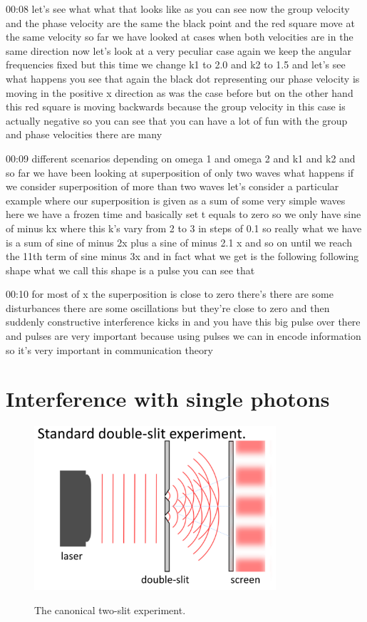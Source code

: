 00:08
let's see what what that looks like as you can see
now the group velocity and the phase velocity are the same
the black point and the red square move at the same velocity
so far we have looked at cases when both velocities
are in the same direction now let's look at a very peculiar case
again we keep the angular frequencies fixed but this time we change k1 to 2.0
and k2 to 1.5 and let's see what happens you see that again the black dot
representing our phase velocity is moving in the positive x direction
as was the case before but on the other hand this red square
is moving backwards because the group velocity in this case
is actually negative so you can see that
you can have a lot of fun with the group and phase velocities there are many

00:09
different scenarios depending on omega 1 and omega 2 and k1 and k2
and so far we have been looking at superposition of only two waves
what happens if we consider superposition of more than two waves
let's consider a particular example where our superposition
is given as a sum of some very simple waves
here we have a frozen time and basically set t equals to zero
so we only have sine of minus kx where this k's vary from 2 to 3 in steps of 0.1
so really what we have is a sum of sine of minus 2x plus a sine of minus 2.1
x and so on until we reach the 11th term of sine minus 3x
and in fact what we get is the following following shape
what we call this shape is a pulse you can see that

00:10
for most of x the superposition is close to zero there's there are some
disturbances there are some oscillations but they're
close to zero and then suddenly constructive interference kicks in and
you have this big pulse over there and pulses are very important because
using pulses we can in encode information so it's
very important in communication theory

\section{Interference with single photons}

\begin{figure}[H]
   \centering
    \includegraphics[width=0.8\textwidth]{lesson6/standard_double_slit.pdf}
    \label{fig: 1}
    \begin{center}
        \caption{The canonical two-slit experiment.}
    \end{center}
\end{figure}

